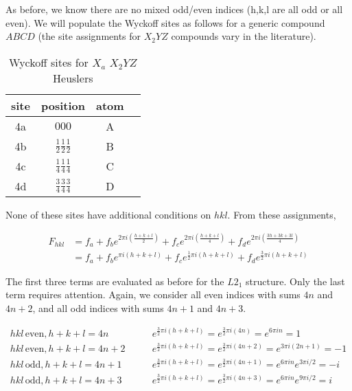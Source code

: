 \documentclass[aps,amsmath,amssymb,prb,superscriptaddress,longtable,preprint,fleqn]{revtex4}
\begin{document}
As before, we know there are no mixed odd/even indices (h,k,l are all odd or all even). We will populate the Wyckoff sites as follows for a generic compound $ABCD$ (the site assignments for $X_2YZ$ compounds vary in the literature).

\begin{table}[htdp]
\begin{center}
\caption{Wyckoff sites for $X_a$ $X_2YZ$ Heuslers}
\begin{tabular}{cccc}
site & position & atom \\
\hline
4a & $000$ & A & \\
4b & $\frac{1}{2}\frac{1}{2}\frac{1}{2}$ & B \\
4c & $\frac{1}{4}\frac{1}{4}\frac{1}{4}$ & C\\
4d & $\frac{3}{4}\frac{3}{4}\frac{3}{4}$ & D
\end{tabular}
\end{center}
\label{wyckoff.xa}
\end{table}%

\noindent None of these sites have additional conditions on $hkl$. From these assignments,

\begin{align}
F_{hkl} &= f_a + f_b e^{2\pi i\left(\frac{h+k+l}{2}\right)} + f_c e^{2\pi i\left(\frac{h+k+l}{4}\right)} + f_d e^{2\pi i\left(\frac{3h+3k+3l}{4}\right)} \nonumber \\
&= f_a + f_b e^{\pi i\left(h+k+l\right)} + f_c e^{\frac{1}{2}\pi i\left(h+k+l\right)} + f_d e^{\frac{3}{2}\pi i\left(h+k+l\right)} \label{eq:sf-XA}
\end{align}

\noindent The first three terms are evaluated as before for the $L2_1$ structure. Only the last term requires attention. Again, we consider all even indices with sums $4n$ and $4n+2$, and all odd indices with sums $4n+1$ and $4n+3$. 

\begin{align}
hkl\,\text{even}, h+k+l=4n \qquad &e^{\frac{3}{2}\pi i\left(h+k+l\right)} = e^{\frac{3}{2}\pi i\left(4n\right)} = e^{6\pi i n} = 1\\
hkl\,\text{even}, h+k+l=4n+2 \qquad &e^{\frac{3}{2}\pi i\left(h+k+l\right)} = e^{\frac{3}{2}\pi i\left(4n+2\right)} = e^{3\pi i \left(2n+1\right)} = -1\\
hkl\,\text{odd}, h+k+l=4n+1 \qquad &e^{\frac{3}{2}\pi i\left(h+k+l\right)} = e^{\frac{3}{2}\pi i\left(4n+1\right)} = e^{6\pi i n}e^{3\pi i/2} = -i \\
hkl\,\text{odd}, h+k+l=4n+3 \qquad &e^{\frac{3}{2}\pi i\left(h+k+l\right)} = e^{\frac{3}{2}\pi i\left(4n+3\right)} = e^{6\pi i n}e^{9\pi i/2} = i
\end{align}
\end{document}
